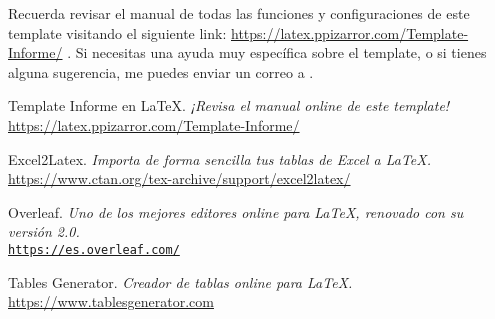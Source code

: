 		Recuerda revisar el manual de todas las funciones y configuraciones de este template visitando el siguiente link: \url{https://latex.ppizarror.com/Template-Informe/} \cite{templateinforme}. Si necesitas una ayuda muy específica sobre el template, o si tienes alguna sugerencia, me puedes enviar un correo a .


\newpage %
\begin{references}
	Template Informe en \LaTeX.
	\textit{¡Revisa el manual online de este template!} \\
	\url{https://latex.ppizarror.com/Template-Informe/}

	Excel2Latex.
	\textit{Importa de forma sencilla tus tablas de Excel a \LaTeX.} \\
	\url{https://www.ctan.org/tex-archive/support/excel2latex/}

	Overleaf.
	\textit{Uno de los mejores editores online para \LaTeX, renovado con su versión 2.0.} \\
	\href{https://es.overleaf.com}{\texttt{https://es.overleaf.com/}}
	
	Tables Generator.
	\textit{Creador de tablas online para \LaTeX.}\\
	\url{https://www.tablesgenerator.com}
\end{references}


